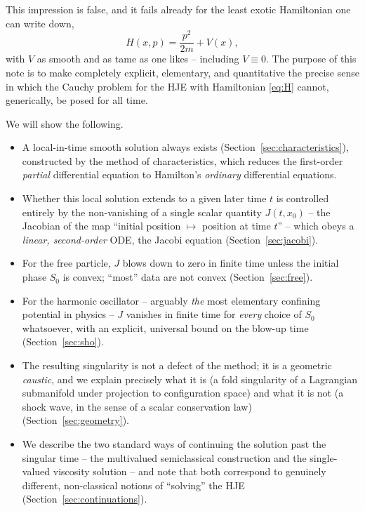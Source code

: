 \documentclass[11pt]{article}
\theoremstyle{plain}
\theoremstyle{definition}
\theoremstyle{remark}
\begin{document}
This impression is false, and it fails already for the least exotic Hamiltonian
one can write down,
\begin{equation}
H(x,p) = \frac{p^2}{2m} + V(x),
\label{eq:H}
\end{equation}
with $V$ as smooth and as tame as one likes -- including $V\equiv 0$. The
purpose of this note is to make completely explicit, elementary, and
quantitative the precise sense in which the Cauchy problem for the HJE with
Hamiltonian \eqref{eq:H} cannot, generically, be posed for all time.

We will show the following.
\begin{itemize}
\item[(i)] A local-in-time smooth solution always exists
    (Section~\ref{sec:characteristics}), constructed by the method of
        characteristics, which reduces the first-order \emph{partial}
        differential equation to Hamilton's \emph{ordinary} differential
        equations.
\item[(ii)] Whether this local solution extends to a given later time $t$ is
    controlled entirely by the non-vanishing of a single scalar quantity
        $J(t,x_0)$ -- the Jacobian of the map ``initial position $\mapsto$
        position at time $t$'' -- which obeys a \emph{linear, second-order}
        ODE, the Jacobi equation (Section~\ref{sec:jacobi}).
\item[(iii)] For the free particle, $J$ blows down to zero in finite time
    unless the initial phase $S_0$ is convex; ``most'' data are not convex
        (Section~\ref{sec:free}).
\item[(iv)] For the harmonic oscillator -- arguably \emph{the} most elementary
    confining potential in physics -- $J$ vanishes in finite time for
        \emph{every} choice of $S_0$ whatsoever, with an explicit, universal
        bound on the blow-up time (Section~\ref{sec:sho}).
\item[(v)] The resulting singularity is not a defect of the method; it is a
    geometric \emph{caustic}, and we explain precisely what it is (a fold
        singularity of a Lagrangian submanifold under projection to
        configuration space) and what it is not (a shock wave, in the sense of
        a scalar conservation law) (Section~\ref{sec:geometry}).
\item[(vi)] We describe the two standard ways of continuing the solution past
    the singular time -- the multivalued semiclassical construction and the
        single-valued viscosity solution -- and note that both correspond to
        genuinely different, non-classical notions of ``solving'' the HJE
        (Section~\ref{sec:continuations}).
\end{itemize}
\end{document}
